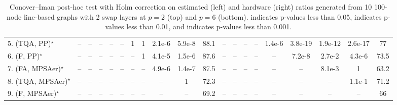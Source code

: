 \begin{table}[ht]
{\begin{tabular}{l|cccccccccc|ccccccccc|}
5. (TQA, PP)$^\star$ & -- & -- & -- & -- & -- & 1 & 1 & {\cellcolor[HTML]{00441B}} \color[HTML]{F1F1F1} 2.1e-6 & {\cellcolor[HTML]{00441B}} \color[HTML]{F1F1F1} 5.9e-8 & 88.1 & -- & -- & -- & -- & {\cellcolor[HTML]{00441B}} \color[HTML]{F1F1F1} 1.4e-6 & {\cellcolor[HTML]{00441B}} \color[HTML]{F1F1F1} 3.8e-19 & {\cellcolor[HTML]{00441B}} \color[HTML]{F1F1F1} 1.9e-12 & {\cellcolor[HTML]{00441B}} \color[HTML]{F1F1F1} 2.6e-17 & 77 \\
6. (F, PP)$^\star$ & -- & -- & -- & -- & -- & -- & 1 & {\cellcolor[HTML]{00441B}} \color[HTML]{F1F1F1} 4.1e-5 & {\cellcolor[HTML]{00441B}} \color[HTML]{F1F1F1} 1.5e-6 & 87.6 & -- & -- & -- & -- & -- & {\cellcolor[HTML]{00441B}} \color[HTML]{F1F1F1} 7.2e-8 & {\cellcolor[HTML]{B5E1AE}} \color[HTML]{000000} 2.7e-2 & {\cellcolor[HTML]{00441B}} \color[HTML]{F1F1F1} 4.3e-6 & 73.5 \\
7. (FA, MPSAer)$^\star$ & -- & -- & -- & -- & -- & -- & -- & {\cellcolor[HTML]{00441B}} \color[HTML]{F1F1F1} 4.9e-6 & {\cellcolor[HTML]{00441B}} \color[HTML]{F1F1F1} 1.4e-7 & 87.5 & -- & -- & -- & -- & -- & -- & {\cellcolor[HTML]{309950}} \color[HTML]{F1F1F1} 8.1e-3 & 1 & 63.2 \\
8. (TQA, MPSAer)$^\star$ & -- & -- & -- & -- & -- & -- & -- & -- & 1 & 72.3 & -- & -- & -- & -- & -- & -- & -- & 1.1e-1 & 71.2 \\
9. (F, MPSAer)$^\star$ & -- & -- & -- & -- & -- & -- & -- & -- & -- & 69.2 & -- & -- & -- & -- & -- & -- & -- & -- & 66 \\
\hline

\end{tabular}
}
\caption{Conover–Iman post-hoc test with Holm correction on estimated (left) and hardware (right) ratios generated from 10 100-node line-based graphs with 2 swap layers at $p=2$ (top) and $p=6$ (bottom).  indicates p-values less than 0.05,  indicates p-values less than 0.01, and  indicates p-values less than 0.001.}
\label{tab:N100L2S2_2_6_100pc_hw}
\end{table}